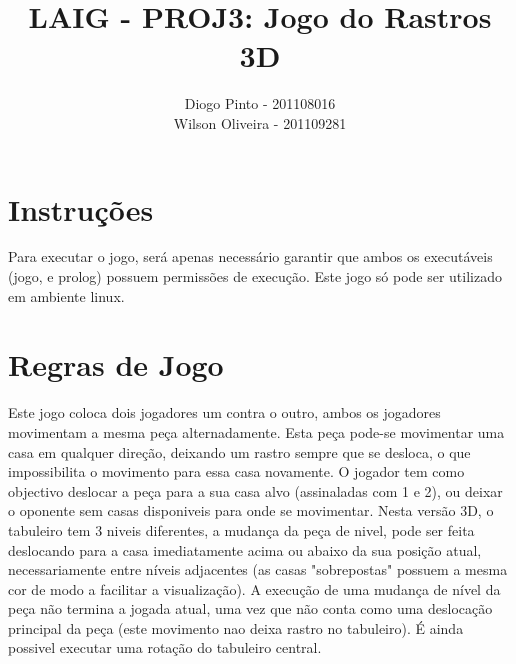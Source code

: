 \documentclass[11pt,a4paper]{report}
\begin{document}
\title{LAIG - PROJ3: Jogo do Rastros 3D}
\author{Diogo Pinto - 201108016 \\ Wilson Oliveira - 201109281}

\pagestyle{fancy}
	
\lhead{\rightmark}
\chead{}
\rhead{\leftmark}
	
\lfoot{}
\cfoot{\thepage}
\rfoot{}	

\maketitle

\section{Instruções}
Para executar o jogo, será apenas necessário garantir que ambos os executáveis (jogo, e prolog) possuem permissões de execução. 
Este jogo só pode ser utilizado em ambiente linux.

\section{Regras de Jogo}
Este jogo coloca dois jogadores um contra o outro, ambos os jogadores movimentam a mesma peça alternadamente. Esta peça pode-se movimentar uma casa em qualquer direção, deixando um rastro sempre que se desloca, o que impossibilita o movimento para essa casa novamente.
O jogador tem como objectivo deslocar a peça para a sua casa alvo (assinaladas com 1 e 2), ou deixar o oponente sem casas disponiveis para onde se movimentar.
Nesta versão 3D, o tabuleiro tem 3 niveis diferentes, a mudança da peça de nivel, pode ser feita deslocando para a casa imediatamente acima ou abaixo da sua posição atual, necessariamente entre níveis adjacentes (as casas "sobrepostas" possuem a mesma cor de modo a facilitar a visualização). A execução de uma mudança de nível da peça não termina a jogada atual, uma vez que não conta como uma deslocação principal da peça (este movimento nao deixa rastro no tabuleiro). É ainda possivel executar uma rotação do tabuleiro central.
\end{document}
